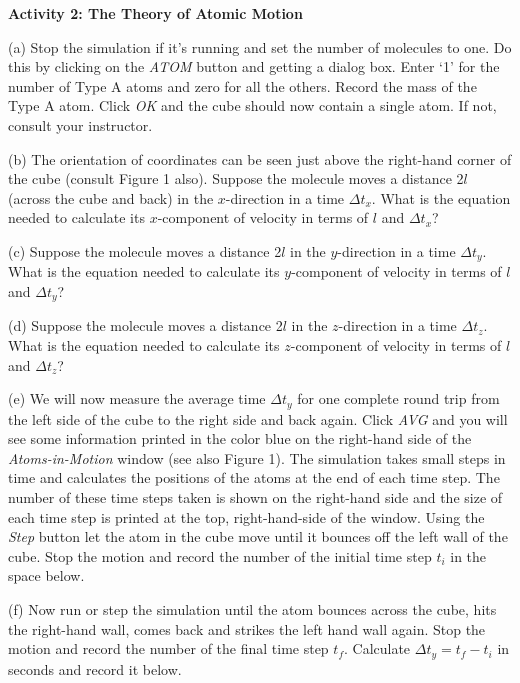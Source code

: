 \pagebreak[2]
\textbf{Activity 2: The Theory of Atomic Motion}

(a) Stop the simulation if it's running and set the number of molecules to 
one. Do this by clicking on the \textit{ATOM} button and getting a dialog box.
Enter `1' for the
number of Type A atoms and zero for all the others. Record the mass of the
Type A atom. Click \textit{OK} and
the cube should now contain a single atom. If not, consult your instructor.
\answerspace{15mm}

(b) The orientation of coordinates can be seen just above the right-hand corner
of the cube (consult Figure 1 also).
Suppose the molecule moves a distance 2$l$ (across the cube and back) in the $x$-direction in
a time $\Delta t_{x}$. What is the equation needed to calculate
its $x$-component of velocity in terms of $l$ and $\Delta t_{x}$?
\answerspace{15mm}

(c) Suppose the molecule moves a distance 2$l$ in the $y$-direction in
a time $\Delta t_{y}$. What is the equation needed to calculate
its $y$-component of velocity in terms of $l$ and $\Delta t_{y}$?
\answerspace{15mm}

(d) Suppose the molecule moves a distance 2$l$ in the $z$-direction in
a time $\Delta t_{z}$. What is the equation needed to calculate
its $z$-component of velocity in terms of $l$ and $\Delta t_{z}$?
\answerspace{15mm}

(e) We will now measure the average time $\Delta t_y$ for one complete round trip
from the left side of the cube to the right side and back again.
Click \textit{AVG} and you will see some information printed in the color blue
on the right-hand side of the \textit{Atoms-in-Motion} window (see also Figure 1).
The simulation takes small steps in time and calculates the positions of the
atoms at the end of each time step.
The number of these time steps taken is shown on the right-hand side and the size 
of each time step is printed at the top, right-hand-side of the window.
Using the \textit{Step} button let the atom in the cube move until it bounces off the left wall of the cube. Stop the motion and record the number of the initial time step $t_i$ in the space below.
\answerspace{15mm}

(f) Now run or step the simulation until the atom bounces across the cube, hits the right-hand wall, comes back and strikes the left hand wall again. Stop the motion and record the number of the final time step $t_f$.
Calculate $\Delta t_y = t_f - t_i$ in seconds and record it below.
\answerspace{15mm}

